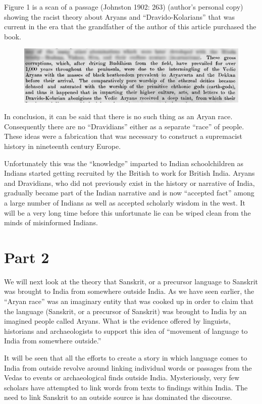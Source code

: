 Figure 1 is a scan of a passage (Johnston 1902: 263) (author’s personal copy) showing the racist theory about Aryans and “Dravido-Kolarians” that was current in the era that the grandfather of the author of this article purchased the book.

\begin{figure}[!htbp]
\includegraphics[scale=0.35]{"images/7-01.jpg"}
\caption{}\label{art7-fig01}
\end{figure}

In conclusion, it can be said that there is no such thing as an Aryan race. Consequently there are no “Dravidians” either as a separate “race” of people. These ideas were a fabrication that was necessary to construct a supremacist history in nineteenth century Europe.

Unfortunately this was the “knowledge” imparted to Indian schoolchildren as Indians started getting recruited by the British to work for British India. Aryans and Dravidians, who did not previously exist in the history or narrative of India, gradually became part of the Indian narrative and is now “accepted fact” among a large number of Indians as well as accepted scholarly wisdom in the west. It will be a very long time before this unfortunate lie can be wiped clean from the minds of misinformed Indians.


\section*{Part 2}

We will next look at the theory that Sanskrit, or a precursor language to Sanskrit was brought to India from somewhere outside India. As we have seen earlier, the “Aryan race” was an imaginary entity that was cooked up in order to claim that the language (Sanskrit, or a precursor of Sanskrit) was brought to India by an imagined people called Aryans. What is the evidence offered by linguists, historians and archaeologists to support this idea of “movement of language to India from somewhere outside.”

It will be seen that all the efforts to create a story in which language comes to India from outside revolve around linking individual words or passages from the Vedas to events or archaeological finds outside India. Mysteriously, very few scholars have attempted to link words from texts to findings within India. The need to link Sanskrit to an outside source is has dominated the discourse.

